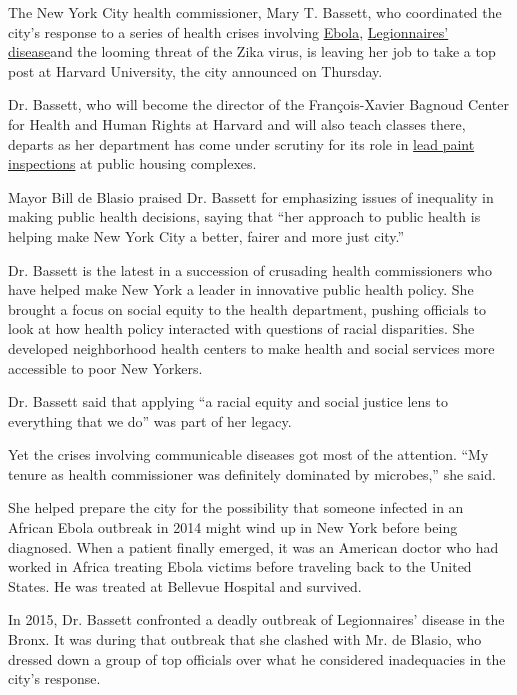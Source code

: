 The New York City health commissioner, Mary T. Bassett, who coordinated
the city's response to a series of health crises involving
\href{https://www.nytimes.com/2014/10/26/nyregion/in-new-york-bringing-a-comforting-message-during-a-chaotic-time.html}{Ebola},
\href{https://www.nytimes.com/2015/08/07/nyregion/new-york-ordering-tests-of-water-cooling-towers-amid-legionnaires-outbreak.html}{Legionnaires'
disease}and the looming threat of the Zika virus, is leaving her job to
take a top post at Harvard University, the city announced on Thursday.

Dr. Bassett, who will become the director of the François-Xavier Bagnoud
Center for Health and Human Rights at Harvard and will also teach
classes there, departs as her department has come under scrutiny for its
role in
\href{https://www.nytimes.com/2018/07/27/nyregion/inquiry-on-public-housing-lead-failures-extends-to-health-department.html}{lead
paint inspections} at public housing complexes.

Mayor Bill de Blasio praised Dr. Bassett for emphasizing issues of
inequality in making public health decisions, saying that ``her approach
to public health is helping make New York City a better, fairer and more
just city.''

Dr. Bassett is the latest in a succession of crusading health
commissioners who have helped make New York a leader in innovative
public health policy. She brought a focus on social equity to the health
department, pushing officials to look at how health policy interacted
with questions of racial disparities. She developed neighborhood health
centers to make health and social services more accessible to poor New
Yorkers.

Dr. Bassett said that applying ``a racial equity and social justice lens
to everything that we do'' was part of her legacy.

Yet the crises involving communicable diseases got most of the
attention. ``My tenure as health commissioner was definitely dominated
by microbes,'' she said.

She helped prepare the city for the possibility that someone infected in
an African Ebola outbreak in 2014 might wind up in New York before being
diagnosed. When a patient finally emerged, it was an American doctor who
had worked in Africa treating Ebola victims before traveling back to the
United States. He was treated at Bellevue Hospital and survived.

In 2015, Dr. Bassett confronted a deadly outbreak of Legionnaires'
disease in the Bronx. It was during that outbreak that she clashed with
Mr. de Blasio, who dressed down a group of top officials over what he
considered inadequacies in the city's response.

